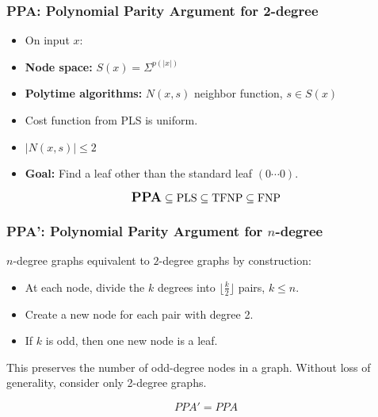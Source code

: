 \documentclass[10pt]{beamer}
\begin{document}
\begin{frame}
\frametitle{PPA: Polynomial Parity Argument for 2-degree}

\begin{itemize}
\item On input $x$:
\item \textbf{Node space:} $S(x) = \Sigma^{p(|x|)}$
\item \textbf{Polytime algorithms:} $N(x,s)$ neighbor function, $s \in S(x)$
\item Cost function from PLS is uniform.
\item $|N(x,s)| \le 2$
\item \textbf{Goal:} Find a leaf other than the standard leaf $(0\cdots 0)$.
\end{itemize}

\begin{displaymath}
\textrm{\large{\textbf{PPA}}} \subseteq \textrm{PLS} \subseteq \textrm{TFNP} \subseteq
\textrm{FNP}
\end{displaymath}

\end{frame}
\begin{frame}
\frametitle{PPA': Polynomial Parity Argument for $n$-degree}

$n$-degree graphs equivalent to $2$-degree graphs by construction:

\begin{itemize}
\item At each node, divide the $k$ degrees into $\lfloor \frac{k}{2} \rfloor$
      pairs, $k \le n$.
\item Create a new node for each pair with degree 2.
\item If $k$ is odd, then one new node is a leaf.
\end{itemize}

This preserves the number of odd-degree nodes in a graph.
Without loss of generality, consider only 2-degree graphs.

\begin{figure}[hbt]
  
  \centerline{\box\graph}
\end{figure}

\begin{displaymath}
PPA' = PPA
\end{displaymath}

\end{frame}
\end{document}
